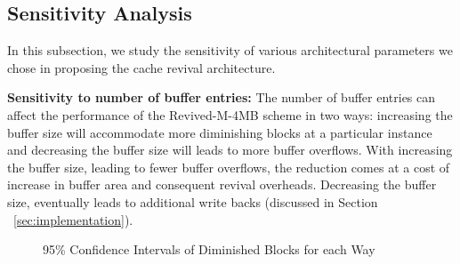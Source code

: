 




\subsection{Sensitivity Analysis}
In this subsection, we study the sensitivity of various architectural parameters we chose in proposing the cache revival architecture.

\noindent\textbf{Sensitivity to number of buffer entries:}
The number of buffer entries can affect the performance of the Revived-M-4MB scheme in two ways: increasing the
buffer size will accommodate more diminishing blocks at a particular instance and decreasing the buffer size will
leads to more buffer overflows. With increasing the buffer size, leading to fewer buffer overflows,
the reduction comes at a cost of increase in buffer area and consequent revival overheads. Decreasing the buffer size, eventually
leads to additional write backs (discussed in Section ~\ref{sec:implementation}).



\begin{figure*} [t]
\centering
 \caption{\label{fig:confi} 95\% Confidence Intervals of Diminished Blocks for each Way}
\end{figure*}

